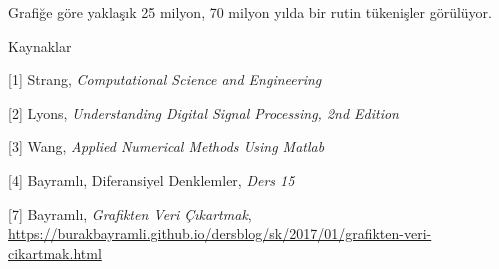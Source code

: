 \documentclass[12pt,fleqn]{article}\usepackage{../../common}
\begin{document}
Grafiğe göre yaklaşık 25 milyon, 70 milyon yılda bir rutin tükenişler görülüyor.


Kaynaklar

[1] Strang, {\em Computational Science and Engineering}

[2] Lyons, {\em Understanding Digital Signal Processing, 2nd Edition}

[3] Wang, {\em Applied Numerical Methods Using Matlab}

[4] Bayramlı, Diferansiyel Denklemler, {\em Ders 15}

[7] Bayramlı, 
    {\em Grafikten Veri Çıkartmak}, 
    \url{https://burakbayramli.github.io/dersblog/sk/2017/01/grafikten-veri-cikartmak.html}


    
\end{document}

